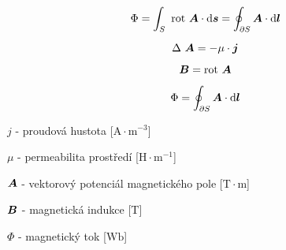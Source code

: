 \begin{equation}
\Phi = \int_S \ \mathrm{rot} \ \boldsymbol{A} \cdot \mathrm{d}\boldsymbol{s} = \oint_{\partial S} \boldsymbol{A} \cdot \mathrm{d}\boldsymbol{l}
\end{equation}

\begin{fact}
\begin{equation}
\Delta \ \boldsymbol{A} = -\mu \cdot \boldsymbol{j}
\end{equation}

\begin{equation}
\boldsymbol{B} = \mathrm{rot} \ \boldsymbol{A}
\end{equation}

\begin{equation}
\Phi = \oint_{\partial S} \boldsymbol{A} \cdot \mathrm{d}\boldsymbol{l}
\end{equation}

\(j\) - proudová hustota [\(\mathrm{A} \cdot \mathrm{m}^{-3}\)]

\(\mu\) - permeabilita prostředí [\(\mathrm{H} \cdot \mathrm{m}^{-1}\)]

\(\boldsymbol{A}\) - vektorový potenciál magnetického pole [\(\mathrm{T} \cdot \mathrm{m}\)]

\(\boldsymbol{B}\) - magnetická indukce [\(\mathrm{T}\)]

\(\Phi\) - magnetický tok [\(\mathrm{Wb}\)]
\end{fact}
